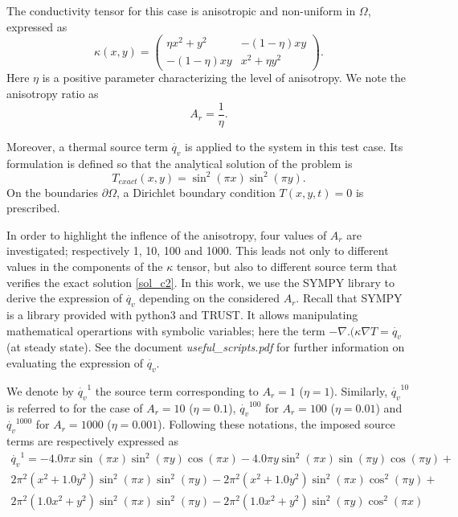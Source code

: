The conductivity tensor for this case is anisotropic and non-uniform in $\Omega$, expressed as
\begin{equation}\label{tensor_c2}
\kappa(x,y)=\left(\begin{matrix} \eta x^2 +y^2 & -(1-\eta)xy \\ -(1-\eta)xy & x^2 + \eta y^2 \end{matrix}\right). 
\end{equation}
Here $\eta$ is a positive parameter characterizing the level of anisotropy. We note the anisotropy ratio as
\begin{equation}
A_r=\frac{1}{\eta}.
\end{equation}

Moreover, a thermal source term $\dot{q_v}$ is applied to the system in this test case. Its formulation is defined so that the analytical solution of the problem is 
\begin{equation}\label{sol_c2}
T_{exact}(x,y)=\sin^2(\pi x)\sin^2(\pi y).
\end{equation}
On the boundaries $\partial \Omega$, a Dirichlet boundary condition $T(x,y,t)=0$ is prescribed. 

In order to highlight the inflence of the anisotropy, four values of $A_r$ are investigated; respectively 1, 10, 100 and 1000. This leads not only to different values in the components of the $\kappa$ tensor, but also to different source term that verifies the exact solution \eqref{sol_c2}. In this work, we use the SYMPY library to derive the expression of $\dot{q_v}$ depending on the considered $A_r$. Recall that SYMPY is a library provided with python3 and TRUST. It allows manipulating mathematical operartions with symbolic variables; here the term $-\nabla.(\kappa \nabla T=\dot{q_v}$ (at steady state). See the document \textit{useful\_scripts.pdf} for further information on evaluating the expression of $\dot{q_v}$.

We denote by $\dot{q_v}^1$ the source term corresponding to $A_r=1$ ($\eta=1$). Similarly, $\dot{q_v}^{10}$ is referred to for the case of $A_r=10$ ($\eta=0.1$), $\dot{q_v}^{100}$ for $A_r=100$ ($\eta=0.01$) and $\dot{q_v}^{1000}$ for $A_r=1000$ ($\eta=0.001$). Following these notations, the imposed source terms are respectively expressed as
\begin{multline}
\dot{q_v}^1=- 4.0 \pi x \sin{\left(\pi x \right)} \sin^{2}{\left(\pi y \right)} \cos{\left(\pi x \right)}     - 4.0 \pi y \sin^{2}{\left(\pi x \right)} \sin{\left(\pi y \right)} \cos{\left(\pi y \right)} +\\ 2     \pi^{2} \left(x^{2} + 1.0 y^{2}\right) \sin^{2}{\left(\pi x \right)} \sin^{2}{\left(\pi y \right    )} - 2 \pi^{2} \left(x^{2} + 1.0 y^{2}\right) \sin^{2}{\left(\pi x \right)} \cos^{2}{\left(\pi y     \right)} +\\ 2 \pi^{2} \left(1.0 x^{2} + y^{2}\right) \sin^{2}{\left(\pi x \right)} \sin^{2}{\left(    \pi y \right)} - 2 \pi^{2} \left(1.0 x^{2} + y^{2}\right) \sin^{2}{\left(\pi y \right)} \cos^{2}{    \left(\pi x \right)} 
\end{multline}


